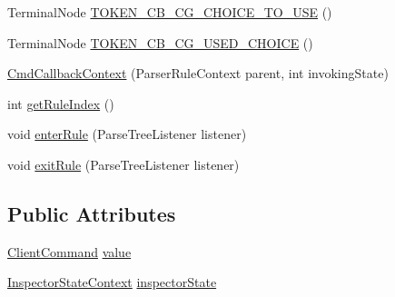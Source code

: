 \begin{DoxyCompactItemize}
\item 
Terminal\+Node \hyperlink{classgov_1_1nasa_1_1jpf_1_1inspector_1_1client_1_1parser_1_1_console_grammar_parser_1_1_cmd_callback_context_ac71ff92a95b3ad3f2101e5a17cdd375b}{T\+O\+K\+E\+N\+\_\+\+C\+B\+\_\+\+C\+G\+\_\+\+C\+H\+O\+I\+C\+E\+\_\+\+T\+O\+\_\+\+U\+SE} ()
\item 
Terminal\+Node \hyperlink{classgov_1_1nasa_1_1jpf_1_1inspector_1_1client_1_1parser_1_1_console_grammar_parser_1_1_cmd_callback_context_aacbeabdf45137958b124d8cbf20fa5bf}{T\+O\+K\+E\+N\+\_\+\+C\+B\+\_\+\+C\+G\+\_\+\+U\+S\+E\+D\+\_\+\+C\+H\+O\+I\+CE} ()
\item 
\hyperlink{classgov_1_1nasa_1_1jpf_1_1inspector_1_1client_1_1parser_1_1_console_grammar_parser_1_1_cmd_callback_context_af949047dc443efb951100a911a214bef}{Cmd\+Callback\+Context} (Parser\+Rule\+Context parent, int invoking\+State)
\item 
int \hyperlink{classgov_1_1nasa_1_1jpf_1_1inspector_1_1client_1_1parser_1_1_console_grammar_parser_1_1_cmd_callback_context_a4cba0fd36595ef628e08a78ff8a94b02}{get\+Rule\+Index} ()
\item 
void \hyperlink{classgov_1_1nasa_1_1jpf_1_1inspector_1_1client_1_1parser_1_1_console_grammar_parser_1_1_cmd_callback_context_aa1e648ac0f651ee7c1e39f2992d862b3}{enter\+Rule} (Parse\+Tree\+Listener listener)
\item 
void \hyperlink{classgov_1_1nasa_1_1jpf_1_1inspector_1_1client_1_1parser_1_1_console_grammar_parser_1_1_cmd_callback_context_a63faf0806828b23d38fb723463f114d3}{exit\+Rule} (Parse\+Tree\+Listener listener)
\end{DoxyCompactItemize}
\subsection*{Public Attributes}
\begin{DoxyCompactItemize}
\item 
\hyperlink{classgov_1_1nasa_1_1jpf_1_1inspector_1_1client_1_1_client_command}{Client\+Command} \hyperlink{classgov_1_1nasa_1_1jpf_1_1inspector_1_1client_1_1parser_1_1_console_grammar_parser_1_1_cmd_callback_context_a3af191afae22a2516c97691be7eb9e9c}{value}
\item 
\hyperlink{classgov_1_1nasa_1_1jpf_1_1inspector_1_1client_1_1parser_1_1_console_grammar_parser_1_1_inspector_state_context}{Inspector\+State\+Context} \hyperlink{classgov_1_1nasa_1_1jpf_1_1inspector_1_1client_1_1parser_1_1_console_grammar_parser_1_1_cmd_callback_context_aa6cce69dfc80b3323df9017104afba70}{inspector\+State}
\end{DoxyCompactItemize}


